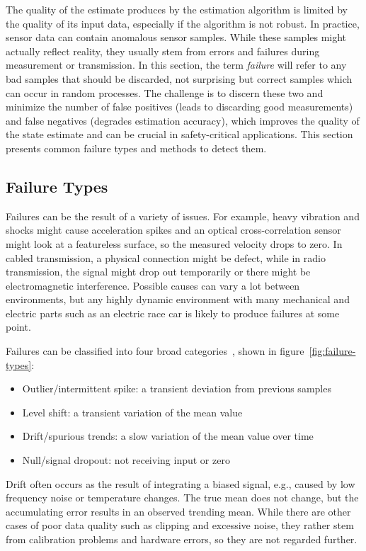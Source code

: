 The quality of the estimate produces by the estimation algorithm is limited by the quality of its input data, especially if the algorithm is not robust. In practice, sensor data can contain anomalous sensor samples. While these samples might actually reflect reality, they usually stem from errors and failures during measurement or transmission. In this section, the term \textit{failure} will refer to any bad samples that should be discarded, not surprising but correct samples which can occur in random processes. The challenge is to discern these two and minimize the number of false positives (leads to discarding good measurements) and false negatives (degrades estimation accuracy), which improves the quality of the state estimate and can be crucial in safety-critical applications. This section presents common failure types and methods to detect them.


\subsection{Failure Types}\label{sec:failure-types}
Failures can be the result of a variety of issues. For example, heavy vibration and shocks might cause acceleration spikes and an optical cross-correlation sensor might look at a featureless surface, so the measured velocity drops to zero. In cabled transmission, a physical connection might be defect, while in radio transmission, the signal might drop out temporarily or there might be electromagnetic interference. Possible causes can vary a lot between environments, but any highly dynamic environment with many mechanical and electric parts such as an electric race car is likely to produce failures at some point.

Failures can be classified into four broad categories~\cites[p.~19]{Kabzan.2019}[p.~165~ff.]{Himmelblau.1994}, shown in figure~\ref{fig:failure-types}:
\begin{itemize}
\item Outlier/intermittent spike: a transient deviation from previous samples
\item Level shift: a transient variation of the mean value
\item Drift/spurious trends: a slow variation of the mean value over time
\item Null/signal dropout: not receiving input or zero
\end{itemize}
Drift often occurs as the result of integrating a biased signal, e.g., caused by low frequency noise or temperature changes. The true mean does not change, but the accumulating error results in an observed trending mean. While there are other cases of poor data quality such as clipping and excessive noise, they rather stem from calibration problems and hardware errors, so they are not regarded further.

